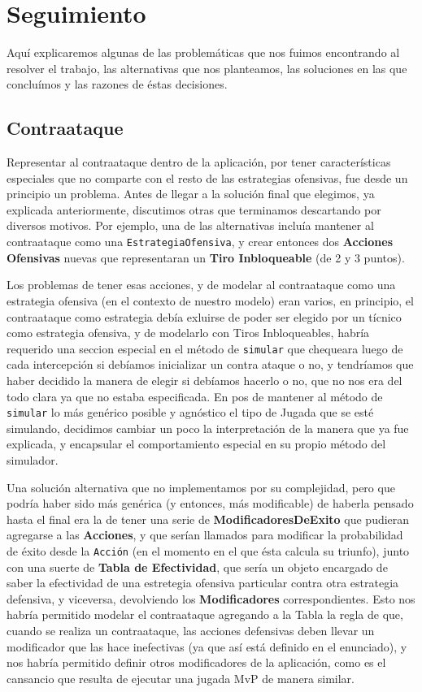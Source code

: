 \section{Seguimiento}

Aquí explicaremos algunas de las problemáticas que nos fuimos encontrando al resolver el trabajo, las alternativas que nos planteamos, las soluciones en las que concluímos y las razones de éstas decisiones.

\subsection{Contraataque}

Representar al contraataque dentro de la aplicación, por tener características especiales que no comparte con el resto de las estrategias ofensivas, fue desde un principio un problema. Antes de llegar a la solución final que elegimos, ya explicada anteriormente, discutimos otras que terminamos descartando por diversos motivos. Por ejemplo, una de las alternativas incluía mantener al contraataque como una \texttt{EstrategiaOfensiva}, y crear entonces dos \textbf{Acciones Ofensivas} nuevas que representaran un \textbf{Tiro Inbloqueable} (de 2 y 3 puntos). 

Los problemas de tener esas acciones, y de modelar al contraataque como una estrategia ofensiva (en el contexto de nuestro modelo) eran varios, en principio, el contraataque como estrategia debía exluirse de poder ser elegido por un tícnico como estrategia ofensiva, y de modelarlo con Tiros Inbloqueables, habría requerido una seccion especial en el método de \texttt{simular} que chequeara luego de cada intercepción si debíamos inicializar un contra ataque o no, y tendríamos que haber decidido la manera de elegir si debíamos hacerlo o no, que no nos era del todo clara ya que no estaba especificada. En pos de mantener al método de \texttt{simular} lo más genérico posible y agnóstico el tipo de Jugada que se esté simulando, decidimos cambiar un poco la interpretación de la manera que ya fue explicada, y encapsular el comportamiento especial en su propio método del simulador.

Una solución alternativa que no implementamos por su complejidad, pero que podría haber sido más genérica (y entonces, más modificable) de haberla pensado hasta el final era la de tener una serie de \textbf{ModificadoresDeExito} que pudieran agregarse a las \textbf{Acciones}, y que serían llamados para modificar la probabilidad de éxito desde la \texttt{Acción} (en el momento en el que ésta calcula su triunfo), junto con una suerte de \textbf{Tabla de Efectividad}, que sería un objeto encargado de saber la efectividad de una estretegia ofensiva particular contra otra estrategia defensiva, y viceversa, devolviendo los \textbf{Modificadores} correspondientes. Esto nos habría permitido modelar el contraataque agregando a la Tabla la regla de que, cuando se realiza un contraataque, las acciones defensivas deben llevar un modificador que las hace inefectivas (ya que así está definido en el enunciado), y nos habría permitido definir otros modificadores de la aplicación, como es el cansancio que resulta de ejecutar una jugada MvP de manera similar.


